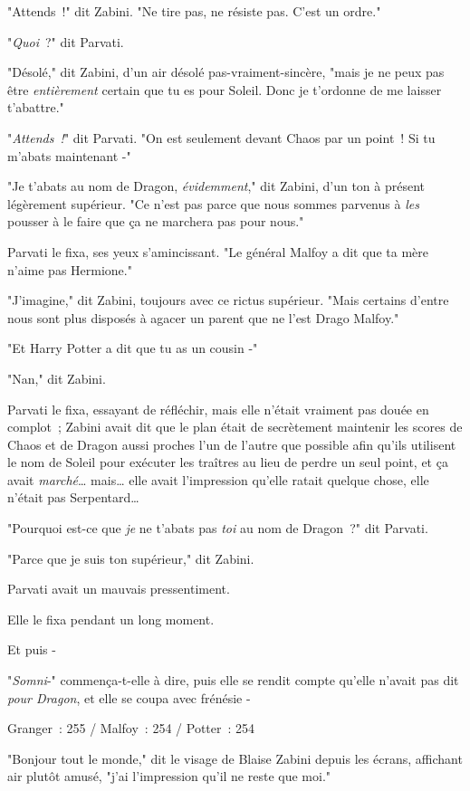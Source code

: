 "Attends~!" dit Zabini. "Ne tire pas, ne résiste pas. C'est un ordre."

"\emph{Quoi}~?" dit Parvati.

"Désolé," dit Zabini, d'un air désolé pas-vraiment-sincère, "mais je ne peux pas être \emph{entièrement} certain que tu es pour Soleil. Donc je t'ordonne de me laisser t'abattre."

"\emph{Attends~!}" dit Parvati. "On est seulement devant Chaos par un point~! Si tu m'abats maintenant -"

"Je t'abats au nom de Dragon, \emph{évidemment}," dit Zabini, d'un ton à présent légèrement supérieur. "Ce n'est pas parce que nous sommes parvenus à \emph{les} pousser à le faire que ça ne marchera pas pour nous."

Parvati le fixa, ses yeux s'amincissant. "Le général Malfoy a dit que ta mère n'aime pas Hermione."

"J'imagine," dit Zabini, toujours avec ce rictus supérieur. "Mais certains d'entre nous sont plus disposés à agacer un parent que ne l'est Drago Malfoy."

"Et Harry Potter a dit que tu as un cousin -"

"Nan," dit Zabini.

Parvati le fixa, essayant de réfléchir, mais elle n'était vraiment pas douée en complot~; Zabini avait dit que le plan était de secrètement maintenir les scores de Chaos et de Dragon aussi proches l'un de l'autre que possible afin qu'ils utilisent le nom de Soleil pour exécuter les traîtres au lieu de perdre un seul point, et ça avait \emph{marché}… mais… elle avait l'impression qu'elle ratait quelque chose, elle n'était pas Serpentard…

"Pourquoi est-ce que \emph{je} ne t'abats pas \emph{toi} au nom de Dragon~?" dit Parvati.

"Parce que je suis ton supérieur," dit Zabini.

Parvati avait un mauvais pressentiment.

Elle le fixa pendant un long moment.

Et puis -

"\emph{Somni}-" commença-t-elle à dire, puis elle se rendit compte qu'elle n'avait pas dit \emph{pour Dragon}, et elle se coupa avec frénésie -

\later

Granger~: 255 / Malfoy~: 254 / Potter~: 254

"Bonjour tout le monde," dit le visage de Blaise Zabini depuis les écrans, affichant air plutôt amusé, "j'ai l'impression qu'il ne reste que moi."

